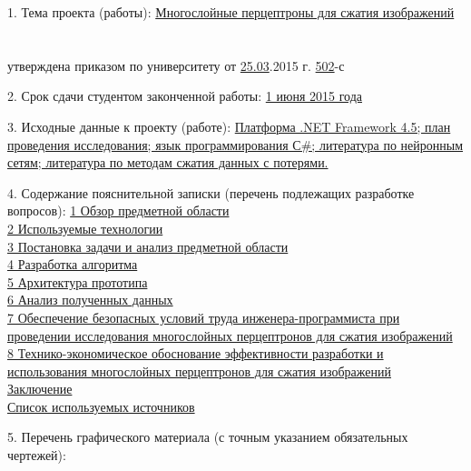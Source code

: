 {  1. Тема проекта (работы):
  \uline{Многослойные перцептроны для сжатия изображений}\lineunderscore\\
  \lineunderscore\\
  \lineunderscore\\
  утверждена приказом по университету от \uline{25.03}.2015 г.  \textnumero \uline{502}-с

  \vspace{1em}

  2. Срок сдачи студентом законченной работы: \uline{1 июня 2015 года}\lineunderscore

  \vspace{1em}

  3. Исходные данные к проекту (работе):
  \uline{Платформа .NET Framework 4.5; план проведения исследования; язык программирования С\#; литература по нейронным сетям; литература по методам сжатия данных с потерями.}\lineunderscore\\
  \lineunderscore

  \vspace{1em}

  4. Содержание пояснительной записки (перечень подлежащих разработке вопросов):
  \uline{1 Обзор предметной области}\lineunderscore\\
  \uline{2 Используемые технологии}\lineunderscore\\
  \uline{3 Постановка задачи и анализ предметной области}\lineunderscore\\
  \uline{4 Разработка алгоритма}\lineunderscore\\
  \uline{5 Архитектура прототипа}\lineunderscore\\
  \uline{6 Анализ полученных данных}\lineunderscore\\
  \uline{7 Обеспечение безопасных условий труда инженера-программиста при проведении исследования многослойных перцептронов для сжатия изображений}\lineunderscore\\
  \uline{8 Технико-экономическое обоснование эффективности разработки и использования многослойных перцептронов для сжатия изображений}\lineunderscore\\
  \uline{Заключение}\lineunderscore\\
  \uline{Список используемых источников}\lineunderscore

  \clearpage
  \thispagestyle{empty}

  5. Перечень графического материала (с точным указанием обязательных чертежей):
  \lineunderscore\\
  \lineunderscore\\
  \lineunderscore\\
  \lineunderscore\\
  \lineunderscore\\
  \lineunderscore\\
  \lineunderscore\\
  \lineunderscore

}
